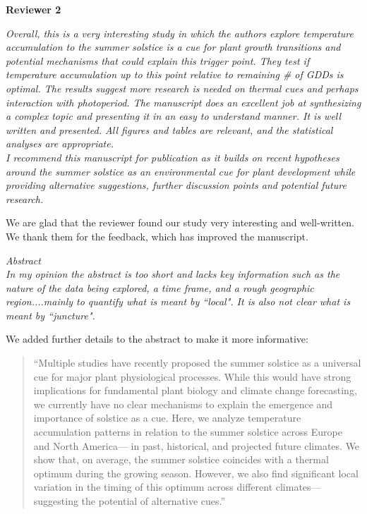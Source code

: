 \documentclass[11pt,letter]{article}
\begin{document}
{\bf Reviewer 2}

\begin{mybox}
\emph{Overall, this is a very interesting study in which the authors explore temperature accumulation to the summer solstice is a cue for plant growth transitions and potential mechanisms that could explain this trigger point. They test if temperature accumulation up to this point relative to remaining \# of GDDs is optimal. The results suggest more research is needed on thermal cues and perhaps interaction with photoperiod. The manuscript does an excellent job at synthesizing a complex topic and presenting it in an easy to understand manner. It is well written and presented. All figures and tables are relevant, and the statistical analyses are appropriate.\\
I recommend this manuscript for publication as it builds on recent hypotheses around the summer solstice as an environmental cue for plant development while providing alternative suggestions, further discussion points and potential future research.}
\end{mybox}

We are glad that the reviewer found our study very interesting and well-written. We thank them for the feedback, which has improved the manuscript.\\

\begin{mybox}
\emph{Abstract\\
In my opinion the abstract is too short and lacks key information such as the nature of the data being explored, a time frame, and a rough geographic region....mainly to quantify what is meant by ``local". It is also not clear what is meant by ``juncture".}
\end{mybox}

We added further details to the abstract to make it more informative:
\begin{quote}
    ``Multiple studies have recently proposed the summer solstice as a universal cue for major plant physiological processes. While this would have strong implications for fundamental plant biology and climate change forecasting,  we currently have no clear mechanisms to explain the emergence and importance of solstice as a cue. Here, we analyze temperature accumulation patterns in relation to the summer solstice across Europe and North America--- in past, historical, and projected future climates. 
    We show that, on average, the summer solstice coincides with a thermal optimum during the growing season. However, we also find significant local variation in the timing of this optimum across different climates---suggesting the potential of alternative cues.''
\end{quote}
\end{document}
